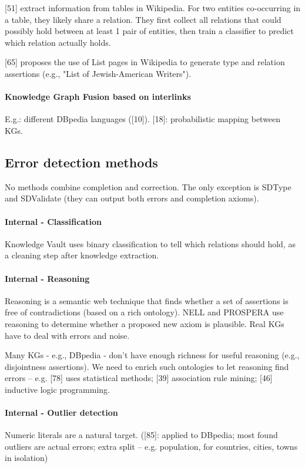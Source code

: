[51] extract information from tables in Wikipedia.
For two entities co-occurring in a table, they likely share a relation.
They first collect all relations that could possibly hold between at least 1
pair of entities, then train a classifier to predict which relation actually
holds.

[65] proposes the use of List pages in Wikipedia to generate type and relation
assertions (e.g., "List of Jewish-American Writers").

\paragraph{Knowledge Graph Fusion based on interlinks}
E.g.: different DBpedia languages ([10]). [18]: probabilistic mapping between
KGs.

\subsection{Error detection methods}
No methods combine completion and correction. The only exception is SDType and
SDValidate (they can output both errors and completion axioms).

\paragraph{Internal - Classification}
Knowledge Vault uses binary classification to tell which relations should hold,
as a cleaning step after knowledge extraction.

\paragraph{Internal - Reasoning}
Reasoning is a semantic web technique that finds whether a set of assertions is
free of contradictions (based on a rich ontology).
NELL and PROSPERA use reasoning to determine whether a proposed new axiom is
plausible. Real KGs have to deal with errors and noise.

Many KGs - e.g., DBpedia - don't have enough richness for useful reasoning
(e.g., disjointness assertions). We need to enrich such ontologies to let
reasoning find errors -- e.g. [78] uses statistical methods; [39] association
rule mining; [46] inductive logic programming.

\paragraph{Internal - Outlier detection}
Numeric literals are a natural target. ([85]: applied to DBpedia; most found
outliers are actual errors; extra split -- e.g. population, for countries,
cities, towns in isolation)

